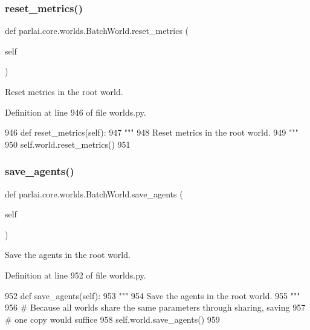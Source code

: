 \subsubsection{\texorpdfstring{reset\+\_\+metrics()}{reset\_metrics()}}
{\footnotesize\ttfamily def parlai.\+core.\+worlds.\+Batch\+World.\+reset\+\_\+metrics (\begin{DoxyParamCaption}\item[{}]{self }\end{DoxyParamCaption})}

\begin{DoxyVerb}Reset metrics in the root world.
\end{DoxyVerb}
 

Definition at line 946 of file worlds.\+py.


\begin{DoxyCode}
946     \textcolor{keyword}{def }reset\_metrics(self):
947         \textcolor{stringliteral}{"""}
948 \textcolor{stringliteral}{        Reset metrics in the root world.}
949 \textcolor{stringliteral}{        """}
950         self.world.reset\_metrics()
951 
\end{DoxyCode}
\mbox{\label{classparlai_1_1core_1_1worlds_1_1BatchWorld_a84ee0ac53e07cbfc9bdb8a978a8df7e1}} 
\subsubsection{\texorpdfstring{save\+\_\+agents()}{save\_agents()}}
{\footnotesize\ttfamily def parlai.\+core.\+worlds.\+Batch\+World.\+save\+\_\+agents (\begin{DoxyParamCaption}\item[{}]{self }\end{DoxyParamCaption})}

\begin{DoxyVerb}Save the agents in the root world.
\end{DoxyVerb}
 

Definition at line 952 of file worlds.\+py.


\begin{DoxyCode}
952     \textcolor{keyword}{def }save\_agents(self):
953         \textcolor{stringliteral}{"""}
954 \textcolor{stringliteral}{        Save the agents in the root world.}
955 \textcolor{stringliteral}{        """}
956         \textcolor{comment}{# Because all worlds share the same parameters through sharing, saving}
957         \textcolor{comment}{# one copy would suffice}
958         self.world.save\_agents()
959 
\end{DoxyCode}
\mbox{\label{classparlai_1_1core_1_1worlds_1_1BatchWorld_ad351080076e31498e14789beddf6fea6}} 
